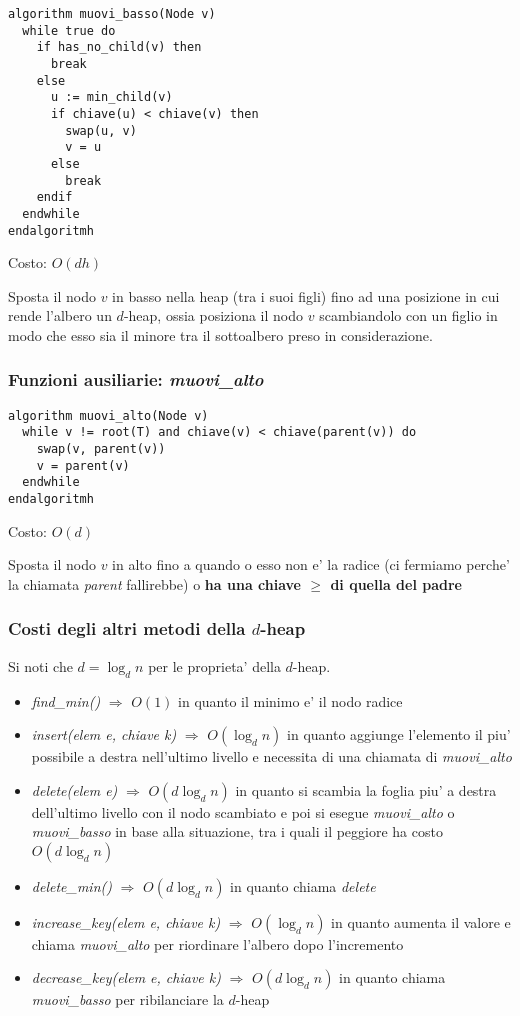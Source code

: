 \documentclass{article}
\begin{document}
\begin{lstlisting}
algorithm muovi_basso(Node v)
  while true do
    if has_no_child(v) then
      break
    else
      u := min_child(v)
      if chiave(u) < chiave(v) then
        swap(u, v)
        v = u
      else
        break
    endif
  endwhile
endalgoritmh
\end{lstlisting}

Costo: $O(dh)$

Sposta il nodo $v$ in basso nella heap (tra i suoi figli) fino ad una posizione
in cui rende l'albero un $d$-heap, ossia posiziona il nodo $v$ scambiandolo con
un figlio in modo che esso sia il minore tra il sottoalbero preso in considerazione.

\subsubsection{Funzioni ausiliarie: \emph{muovi}\_\emph{alto} }

\begin{lstlisting}
algorithm muovi_alto(Node v)
  while v != root(T) and chiave(v) < chiave(parent(v)) do
    swap(v, parent(v))
    v = parent(v)
  endwhile
endalgoritmh
\end{lstlisting}

Costo: $O(d)$

Sposta il nodo $v$ in alto fino a quando o esso non e' la radice (ci fermiamo
perche' la chiamata \emph{parent} fallirebbe) o \textbf{ha una chiave $\geq$ di
quella del padre}

\subsubsection{Costi degli altri metodi della $d$-heap}

Si noti che $d = \log_d n$ per le proprieta' della $d$-heap.

\begin{itemize}
  \item \emph{find\_min()} $\Rightarrow$ $O(1)$ in quanto il minimo e' il
    nodo radice
  \item \emph{insert(elem e, chiave k)} $\Rightarrow$ $O(\log_d n)$ in quanto
    aggiunge l'elemento il piu' possibile a destra nell'ultimo livello e necessita
    di una chiamata di \emph{muovi\_alto}
  \item \emph{delete(elem e)} $\Rightarrow$ $O(d \log_d n)$ in quanto si scambia
    la foglia piu' a destra dell'ultimo livello con il nodo scambiato e poi si
    esegue \emph{muovi\_alto} o \emph{muovi\_basso} in base alla situazione, tra
    i quali il peggiore ha costo $O(d \log_d n)$
  \item \emph{delete\_min()} $\Rightarrow$ $O(d \log_d n)$ in quanto chiama \emph{delete}
  \item \emph{increase\_key(elem e, chiave k)} $\Rightarrow$ $O(\log_d n)$ in
    quanto aumenta il valore e chiama \emph{muovi\_alto} per riordinare l'albero
    dopo l'incremento
  \item \emph{decrease\_key(elem e, chiave k)} $\Rightarrow$ $O(d \log_d n)$ in
    quanto chiama \emph{muovi\_basso} per ribilanciare la $d$-heap
\end{itemize}
\end{document}
